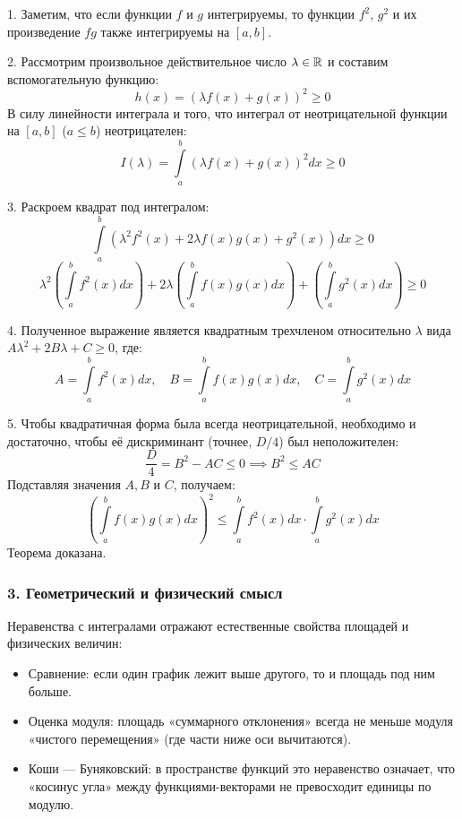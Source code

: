 \begin{tcolorbox}[title=Доказательство, breakable]
1. Заметим, что если функции $f$ и $g$ интегрируемы, то функции $f^2$, $g^2$ и их произведение $fg$ также интегрируемы на $[a, b]$.

2. Рассмотрим произвольное действительное число $\lambda \in \mathbb{R}$ и составим вспомогательную функцию:
\[ h(x) = (\lambda f(x) + g(x))^2 \ge 0 \]
В силу линейности интеграла и того, что интеграл от неотрицательной функции на $[a, b]$ ($a \le b$) неотрицателен:
\[ I(\lambda) = \int\limits_a^b (\lambda f(x) + g(x))^2 dx \ge 0 \]

3. Раскроем квадрат под интегралом:
\[ \int\limits_a^b \left( \lambda^2 f^2(x) + 2\lambda f(x)g(x) + g^2(x) \right) dx \ge 0 \]
\[ \lambda^2 \left( \int\limits_a^b f^2(x) dx \right) + 2\lambda \left( \int\limits_a^b f(x)g(x) dx \right) + \left( \int\limits_a^b g^2(x) dx \right) \ge 0 \]

4. Полученное выражение является квадратным трехчленом относительно $\lambda$ вида $A\lambda^2 + 2B\lambda + C \ge 0$, где:
\[ A = \int\limits_a^b f^2(x) dx, \quad B = \int\limits_a^b f(x)g(x) dx, \quad C = \int\limits_a^b g^2(x) dx \]

5. Чтобы квадратичная форма была всегда неотрицательной, необходимо и достаточно, чтобы её дискриминант (точнее, $D/4$) был неположителен:
\[ \frac{D}{4} = B^2 - AC \le 0 \implies B^2 \le AC \]
Подставляя значения $A, B$ и $C$, получаем:
\[ \left( \int\limits_a^b f(x) g(x) dx \right)^2 \le \int\limits_a^b f^2(x) dx \cdot \int\limits_a^b g^2(x) dx \]
Теорема доказана.
\end{tcolorbox}

\subsubsection*{3. Геометрический и физический смысл}
Неравенства с интегралами отражают естественные свойства площадей и физических величин:
\begin{itemize}
    \item Сравнение: если один график лежит выше другого, то и площадь под ним больше.
    \item Оценка модуля: площадь «суммарного отклонения» всегда не меньше модуля «чистого перемещения» (где части ниже оси вычитаются).
    \item Коши — Буняковский: в пространстве функций это неравенство означает, что «косинус угла» между функциями-векторами не превосходит единицы по модулю.
\end{itemize}

